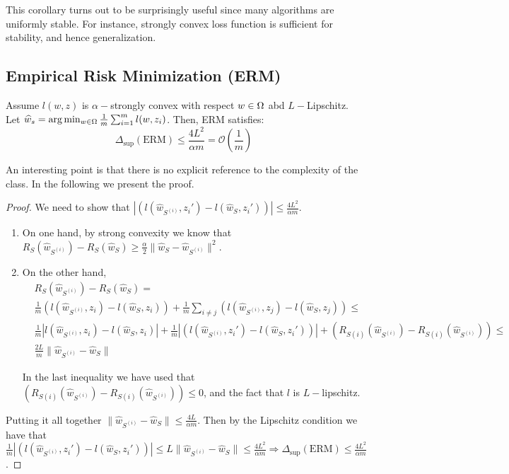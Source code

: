 This corollary turns out to be surprisingly useful since many algorithms are uniformly stable. For instance, strongly convex loss function is sufficient for stability, and hence generalization.

\subsection{Empirical Risk Minimization (ERM)}



\begin{theorem}Assume $l(w, z)$ is $\alpha-$strongly convex with respect $w \in \Omega$ abd $L-$Lipschitz. Let $\widehat w_s = \arg \min_{w\in \Omega} \frac{1}{m} \sum_{i=1}^m l(w, z_i)$. Then, ERM satisfies:
\begin{equation*}
\Delta_{\sup} (\text{ERM}) \leq \frac{4L^2}{\alpha m} = \mathcal{O}(\frac{1}{m}) 
\end{equation*}
\end{theorem}

An interesting point is that there is no explicit reference to the complexity of the class. In the following we present the proof.

\begin{proof}
We need to show that $| ( l(\hat w_{S^(i)}, z_i') - l(\hat w_{S}, z_i')) |  \leq \frac{4 L^2}{\alpha m}$.
\begin{enumerate}
\item On one hand, by strong convexity we know that
$R_S(\hat w_{S^(i)}) - R_S(\hat w_{S}) \geq \frac{\alpha}{2} \| \hat w_{S} - \hat w_{S^(i)} \|^2 $.

\item On the other hand, 
\begin{align*}
& R_S(\hat w_{S^(i)}) - R_S(\hat w_{S}) = \\
& \frac{1}{m} ( l(\hat w_{S^(i)}, z_i) - l(\hat w_{S}, z_i)) + \frac{1}{m} \sum_{i \neq j} ( l(\hat w_{S^(i)}, z_j) - l(\hat w_{S}, z_j))  \leq \\
&\frac{1}{m} | l(\hat w_{S^(i)}, z_i) - l(\hat w_{S}, z_i)| + \frac{1}{m} | ( l(\hat w_{S^(i)}, z_i') - l(\hat w_{S}, z_i')) | + (R_{S(i)}(\hat w_{S^(i)}) - R_{S(i)}(\hat w_{S^(i)})) \leq \\ 
& \frac{2 L}{m} \| \hat w_{S^(i)} - \hat w_{S}\| 
\end{align*}

In the last inequality we have used that $ (R_{S(i)}(\hat w_{S^(i)}) - R_{S(i)}(\hat w_{S^(i)})) \leq 0$, and the fact that $l$ is $L-$lipschitz.
\end{enumerate}

Putting it all together $\| \hat w_{S^(i)} - \hat w_{S} \| \leq \frac{4 L}{\alpha m}$. Then by the Lipschitz condition we have that $\frac{1}{m} | ( l(\hat w_{S^(i)}, z_i') - l(\hat w_{S}, z_i')) | \leq L \| \hat w_{S^(i)} - \hat w_{S} \| \leq \frac{4 L ^ 2}{\alpha m} \Rightarrow \Delta_{\sup} (\text{ERM}) \leq \frac{4 L ^ 2}{\alpha m}$.

\end{proof}


